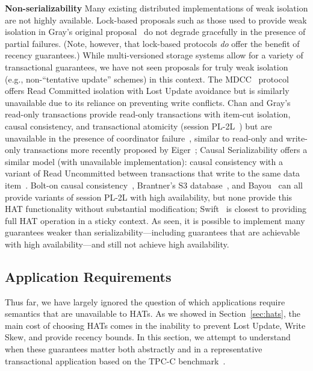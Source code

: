 \vspace{.5em}\noindent\textbf{Non-serializability} Many existing
distributed implementations of weak isolation are not highly
available. Lock-based proposals such as those used to provide weak
isolation in Gray's original proposal~\cite{gray-isolation} do not
degrade gracefully in the presence of partial failures. (Note, however,
that lock-based protocols \textit{do} offer the benefit of recency
guarantees.) While multi-versioned storage systems allow for a variety
of transactional guarantees, we have not seen proposals for truly weak
isolation (e.g., non-``tentative update'' schemes) in this context.
The MDCC~\cite{mdcc} protocol offers Read Committed isolation with
Lost Update avoidance but is similarly unavailable due to its reliance
on preventing write conflicts. Chan and Gray's read-only transactions
provide read-only transactions with item-cut isolation, causal
consistency, and transactional atomicity (session PL-2L~\cite{adya})
but are unavailable in the presence of coordinator
failure~\cite{readonly}, similar to read-only and write-only
transactions more recently proposed by Eiger~\cite{eiger}; Causal
Serializability offers a similar model (with unavailable
implementation): causal consistency with a variant of Read Uncommitted
between transactions that write to the same data
item~\cite{raynal-causal}.  Bolt-on causal consistency~\cite{bolton},
Brantner's S3 database~\cite{kraska-s3}, and
Bayou~\cite{sessionguarantees} can all provide variants of session
PL-2L with high availability, but none provide this HAT functionality
without substantial modification; Swift~\cite{swift} is closest to
providing full HAT operation in a sticky context. As  seen, it
is possible to implement many guarantees weaker than
serializability---including guarantees that are achievable with high
availability---and still not achieve high availability.

\subsection{Application Requirements}

Thus far, we have largely ignored the question of which applications
require semantics that are unavailable to HATs. As we showed in
Section~\ref{sec:hats}, the main cost of choosing HATs comes in the
inability to prevent Lost Update, Write Skew, and provide recency
bounds. In this section, we attempt to understand when these
guarantees matter both abstractly and in a representative
transactional application based on the TPC-C benchmark~\cite{tpcc}.

